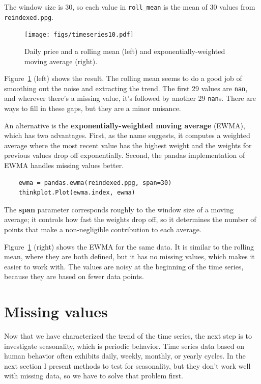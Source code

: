 \documentclass[12pt]{book}
\theoremstyle{exercise}
\begin{document}
The window size is 30, so each value in \verb"roll_mean" is
the mean of 30 values from {\tt reindexed.ppg}.%
%

\begin{figure}
\centerline{\texttt{[image: figs/timeseries10.pdf]}}
\caption{Daily price and a rolling mean (left) and exponentially-weighted
moving average (right).}%
\label{timeseries10}
\end{figure}

Figure~\ref{timeseries10} (left)
shows the result. 
The rolling mean seems to do a good job of smoothing out the noise and
extracting the trend.  The first 29 values are {\tt nan}, and wherever
there's a missing value, it's followed by another 29 {\tt nan}s.
There are ways to fill in these gaps, but they are a minor nuisance.%
%
%

An alternative is the {\bf exponentially-weighted moving average} (EWMA),
which has two advantages.  First, as the name suggests, it computes
a weighted average where the most recent value has the highest weight
and the weights for previous values drop off exponentially.
Second, the pandas implementation of EWMA handles missing values
better.%
%
%

\begin{verbatim}
    ewma = pandas.ewma(reindexed.ppg, span=30)
    thinkplot.Plot(ewma.index, ewma)
\end{verbatim}

The {\bf span} parameter corresponds roughly to the window size of
a moving average; it controls how fast the weights drop off, so it
determines the number of points that make a non-negligible contribution
to each average.%
%

Figure~\ref{timeseries10} (right) shows the EWMA for the same data.
It is similar to the rolling mean, where they are both defined,
but it has no missing values, which makes it easier to work with.  The
values are noisy at the beginning of the time series, because they are
based on fewer data points.%


\section{Missing values}

Now that we have characterized the trend of the time series, the
next step is to investigate seasonality, which is periodic behavior.
Time series data based on human behavior often exhibits daily,
weekly, monthly, or yearly cycles.  In the next section I present
methods to test for seasonality, but they don't work well with
missing data, so we have to solve that problem first.%
%
\end{document}
